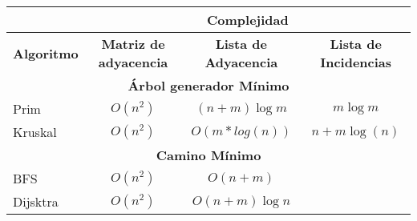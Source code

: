 \begin{center}
  \begin{tabular}{|l|c|c|c|}
    \hline
                       & \multicolumn{3}{c|}{\textbf{Complejidad}}                                                                \\
    \hline
    \textbf{Algoritmo} & \textbf{Matriz de adyacencia}             & \textbf{Lista de Adyacencia} & \textbf{Lista de Incidencias} \\
    \hline
    \multicolumn{4}{|c|}{\cellcolor{blue!25}\textbf{Árbol generador Mínimo}}                                                      \\
    \hline
    Prim               & \(O(n^2)\)                                & \((n + m)\log{m}\)           & \(m\log{m}\)                  \\
    \hline
    Kruskal            & \(O(n^2)\)                                & \(O(m*log(n))\)              & \(n + m\log{(n)}\)            \\
    \hline
    \multicolumn{4}{|c|}{\cellcolor{blue!25}\textbf{Camino Mínimo}}                                                               \\
    \hline
    BFS                & \(O(n^2)\)                                & \(O(n + m)\)                 &                               \\
    \hline
    Dijsktra           & \(O(n^2)\)                                & \(O(n + m)\log{n}\)          &                               \\
    \hline
  \end{tabular}
\end{center}